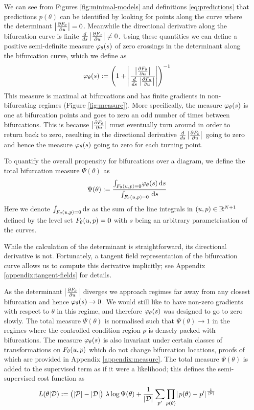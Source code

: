 We can see from Figures \ref{fig:minimal-models} and definitions \eqref{eq:predictions} that predictions $p(\theta)$ can be identified by looking for points along the curve where the determinant $\left| \frac{\partial F_{\theta}}{\partial u} \right|=0$. Meanwhile the directional derivative along the bifurcation curve is finite $\frac{d}{ds}\left| \frac{\partial F_{\theta}}{\partial u} \right|\neq 0$. Using these quantities we can define a positive semi-definite measure $\varphi_{\theta}(s)$ of zero crossings in the determinant along the bifurcation curve, which we define as 
\begin{equation}
    \varphi_{\theta}(s):=
    \left(1+\left|\frac{\left| \frac{\partial F_{\theta}}{\partial u} \right|}{\frac{d}{ds}\left| \frac{\partial F_{\theta}}{\partial u} \right|}\right|\right)^{-1}
    \label{eq:measure}
\end{equation}
This measure is maximal at bifurcations and has finite gradients in non-bifurcating regimes (Figure \ref{fig:measure}). More specifically, the measure $\varphi_{\theta}(s)$ is one at bifurcation points and goes to zero an odd number of times between bifurcations. This is because $\left| \frac{\partial F_{\theta}}{\partial u} \right|$ must eventually turn around in order to return back to zero, resulting in the directional derivative $\frac{d}{ds}\left| \frac{\partial F_{\theta}}{\partial u} \right|$ going to zero and hence the measure $\varphi_{\theta}(s)$ going to zero for each turning point. 

To quantify the overall propensity for bifurcations over a diagram, we define the total bifurcation measure $\Psi(\theta)$ as
\begin{equation}
    \Psi(\theta):=\frac{
        \int_{F_{\theta}(u,p)=0}\!
        \varphi_{\theta}(s)\,\mathrm{d}s
    }{
        \int_{F_{\theta}(u,p)=0}\!\
        \mathrm{d}s
    }
\end{equation}
Here we denote $\int_{F_{\theta}(u,p)=0}\mathrm{d}s$ as the sum of the line integrals in $(u,p)\in\mathbb{R}^{N+1}$ defined by the level set $F_{\theta}(u,p)=0$ with $s$ being an arbitrary parametrisation of the curves.

While the calculation of the determinant is straightforward, its directional derivative is not. Fortunately, a tangent field representation of the bifurcation curve allows us to compute this derivative implicitly; see Appendix \ref{appendix:tangent-fields} for details.

As the determinant $\left| \frac{\partial F_{\theta}}{\partial u} \right|$ diverges we approach regimes far away from any closest bifurcation and hence $\varphi_{\theta}(s)\rightarrow0$. We would still like to have non-zero gradients with respect to $\theta$ in this regime, and therefore $\varphi_{\theta}(s)$ was designed to go to zero slowly. The total measure $\Psi(\theta)$ is normalised such that $\Psi(\theta)\rightarrow1$ in the regimes where the controlled condition region $p$ is densely packed with bifurcations. The measure $\varphi_{\theta}(s)$ is also invariant under certain classes of transformations on $F_{\theta}(u,p)$ which do not change bifurcation locations, proofs of which are provided in Appendix \ref{appendix:measure}. The total measure $\Psi(\theta)$ is added to the supervised term as if it were a likelihood; this defines the semi-supervised cost function as
\begin{align}
    L(\theta|\mathcal{D}):=
    \big(|\mathcal{P}|-|\mathcal{D}|\big)\,\,\lambda \log\Psi(\theta)+
    \frac{1}{|\mathcal{D}|}\sum_{p'}
    \prod_{p(\theta)}|p(\theta)-p'|
    ^{\frac{1}{|\mathcal{P}|}}
    \label{eq:loss}
\end{align}

